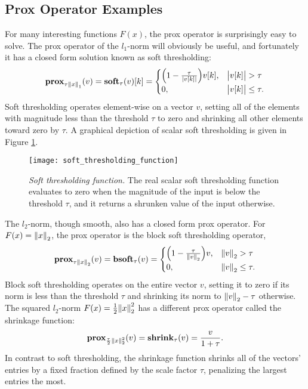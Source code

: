 \subsection{Prox Operator Examples}
For many interesting functions $F(x)$, the prox operator is surprisingly easy to solve. The prox operator of the $l_1$-norm will obviously be useful, and fortunately it has a closed form solution known as soft thresholding:
\begin{equation}
 \prox_{\tau \norm{1}{x}} (v) = \soft_{\tau}(v)[k] =
    \begin{cases}
      \paren*{1 - \frac{\tau}{\abs{v[k]}}} v[k], & \abs[\big]{v[k]} > \tau\\
      0, & \abs[\big]{v[k]} \le \tau.
     \end{cases}
\end{equation}
Soft thresholding operates element-wise on a vector $v$, setting all of the elements with magnitude less than the threshold $\tau$ to zero and shrinking all other elements toward zero by $\tau$. A graphical depiction of scalar soft thresholding is given in Figure \ref{fig:soft_thresholding}.
\begin{figure}[tpb]
 \centering
 \texttt{[image: soft\_thresholding\_function]}
 \caption[Soft thresholding function]{\emph{Soft thresholding function.} The real scalar soft thresholding function evaluates to zero when the magnitude of the input is below the threshold $\tau$, and it returns a shrunken value of the input otherwise.}
 \label{fig:soft_thresholding}
\end{figure}%

The $l_2$-norm, though smooth, also has a closed form prox operator. For $F(x) = \norm{2}{x}$, the prox operator is the block soft thresholding operator,
\begin{equation}
 \prox_{\tau \norm{2}{x}} (v) = \bsoft_{\tau}(v) =
    \begin{cases}
      \paren*{1 - \frac{\tau}{\norm{2}{v}}} v, & \norm{2}{v} > \tau\\
      0, & \norm{2}{v} \le \tau.
     \end{cases}
\end{equation}
Block soft thresholding operates on the entire vector $v$, setting it to zero if its norm is less than the threshold $\tau$ and shrinking its norm to $\norm{2}{v} - \tau$ otherwise. The squared $l_2$-norm $F(x) = \frac{1}{2}\norm{2}{x}^2$ has a different prox operator called the shrinkage function:
\begin{equation}
 \prox_{\frac{\tau}{2}\norm{2}{x}^2} (v) = \shrink_{\tau}(v) = \frac{v}{1 + \tau}.
\end{equation}
In contrast to soft thresholding, the shrinkage function shrinks all of the vectors' entries by a fixed fraction defined by the scale factor $\tau$, penalizing the largest entries the most.

